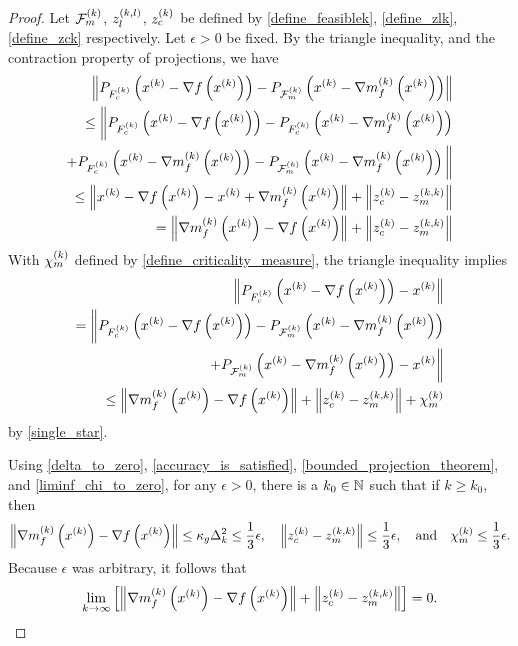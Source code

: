 \begin{proof}
Let 
${\mathcal F_m^{(k)}}$, ${z_l^{(k, l)}}$, ${z_c^{(k)}}$
be defined by 
\cref{define_feasiblek}, \cref{define_zlk}, \cref{define_zck}
respectively.
Let $\epsilon > 0$ be fixed.
By the triangle inequality, and the contraction property of projections, we have
\begin{align}\left \|
 P_{{F_c^{(k)}}}\left(x^{(k)} - \nabla f\left(x^{(k)}\right)\right)
-P_{{\mathcal F_m^{(k)}}}\left(x^{(k)} - {\nabla m_f^{(k)}\left(x^{(k)}\right)} \right)
\right\| \nonumber \\
\le 
\bigg \|
 P_{{F_c^{(k)}}}\left(x^{(k)} - \nabla f\left(x^{(k)}\right)\right) 
-P_{{F_c^{(k)}}}\left(x^{(k)} - {\nabla m_f^{(k)}\left(x^{(k)}\right)} \right) \nonumber \\
+P_{{F_c^{(k)}}}\left(x^{(k)} - {\nabla m_f^{(k)}\left(x^{(k)}\right)} \right)
-P_{{\mathcal F_m^{(k)}}}\left(x^{(k)} - {\nabla m_f^{(k)}\left(x^{(k)}\right)} \right)
\bigg\| \nonumber \\
\le \left\|
x^{(k)} - \nabla f\left(x^{(k)}\right) - x^{(k)} + {\nabla m_f^{(k)}\left(x^{(k)}\right)}
\right\| + \left\|{z_c^{(k)}} - {z_m^{(k, k)}}\right\| \nonumber \\
= \left\|{\nabla m_f^{(k)}\left(x^{(k)}\right)} - \nabla f\left(x^{(k)}\right)\right\| + \left\|{z_c^{(k)}} - {z_m^{(k, k)}}\right\| \label{single_star}
\end{align}
With ${\chi_m^{(k)}}$ defined by \cref{define_criticality_measure}, the triangle inequality implies
\begin{align*}
\left\|P_{{F_c^{(k)}}}\left(x^{(k)} - \nabla f\left(x^{(k)}\right)\right) - x^{(k)} \right\| \\
= \bigg\|
 P_{{F_c^{(k)}}}\left(x^{(k)} - \nabla f\left(x^{(k)}\right)\right)
-P_{{\mathcal F_m^{(k)}}}\left(x^{(k)} - {\nabla m_f^{(k)}\left(x^{(k)}\right)} \right) \\
+P_{{\mathcal F_m^{(k)}}}\left(x^{(k)} - {\nabla m_f^{(k)}\left(x^{(k)}\right)} \right)
- x^{(k)}\bigg\| \\
\le \left\|{\nabla m_f^{(k)}\left(x^{(k)}\right)} - \nabla f\left(x^{(k)}\right)\right\| + \left\|{z_c^{(k)}} - {z_m^{(k, k)}}\right\| + {\chi_m^{(k)}}
\end{align*}
by \cref{single_star}.


Using \cref{delta_to_zero}, \cref{accuracy_is_satisfied}, \cref{bounded_projection_theorem}, and \cref{liminf_chi_to_zero},
for any $\epsilon > 0$, there is a $k_0 \in \mathbb N$ such that if $k \ge k_0$, then
\begin{align*}
\left\|{\nabla m_f^{(k)}\left(x^{(k)}\right)} - \nabla f\left(x^{(k)}\right)\right\| \le \kappa_g \Delta_k^2 \le \frac 1 3 \epsilon,
\quad
\left\|{z_c^{(k)}} - {z_m^{(k, k)}}\right\| \le \frac 1 3 \epsilon,
\quad \textrm{and} \quad
{\chi_m^{(k)}} \le \frac 1 3 \epsilon.
\end{align*}
Because $\epsilon$ was arbitrary, it follows that
\begin{align*}
\lim_{k\to\infty} \left[\left\|{\nabla m_f^{(k)}\left(x^{(k)}\right)} - \nabla f\left(x^{(k)}\right)\right\| + \left\|{z_c^{(k)}} - {z_m^{(k, k)}}\right\|\right] = 0.
\end{align*}
\end{proof}



